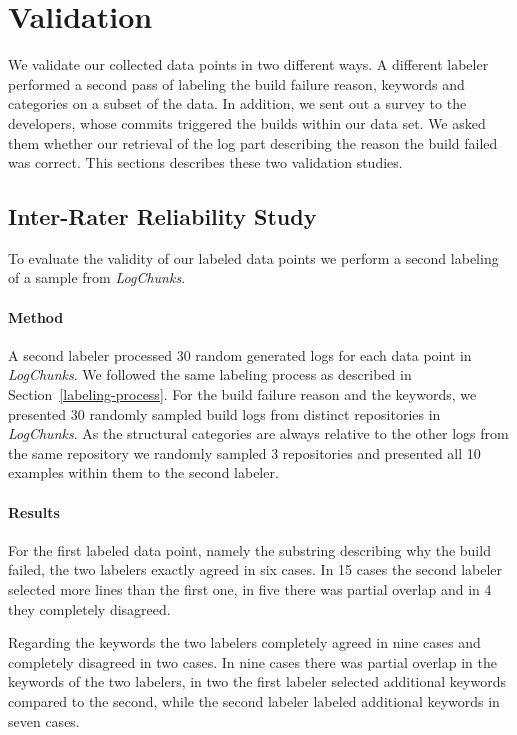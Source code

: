 \documentclass[\myrootdir/main.tex]{subfiles}
\begin{document}
\section{Validation}
We validate our collected data points in two different ways.
A different labeler performed a second pass of labeling the build failure reason, keywords and categories on a subset of the data.
In addition, we sent out a survey to the developers, whose commits triggered the builds within our data set.
We asked them whether our retrieval of the log part describing the reason the build failed was correct.
This sections describes these two validation studies.

\subsection{Inter-Rater Reliability Study}
To evaluate the validity of our labeled data points we perform a second labeling of a sample from \emph{LogChunks}.

\paragraph{Method}
A second labeler processed 30 random generated logs for each data point in \emph{LogChunks}.
We followed the same labeling process as described in Section~\ref{labeling-process}.
For the build failure reason and the keywords, we presented 30 randomly sampled build logs from distinct repositories in \emph{LogChunks}.
As the structural categories are always relative to the other logs from the same repository we randomly sampled 3 repositories and presented all 10 examples within them to the second labeler.

\paragraph{Results}
For the first labeled data point, namely the substring describing why the build failed, the two labelers exactly agreed in six cases.
In 15 cases the second labeler selected more lines than the first one, in five there was partial overlap and in 4 they completely disagreed.

Regarding the keywords the two labelers completely agreed in nine cases and completely disagreed in two cases.
In nine cases there was partial overlap in the keywords of the two labelers, in two the first labeler selected additional keywords compared to the second, while the second labeler labeled additional keywords in seven cases.
\end{document}
